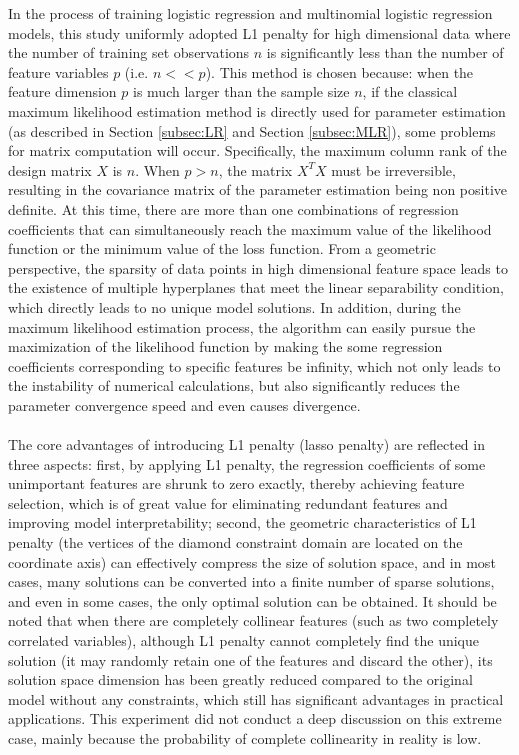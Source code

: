 In the process of training logistic regression and multinomial logistic regression models, this study uniformly adopted L1 penalty for high dimensional data where the number of training set observations $n$ is significantly less than the number of feature variables $p$ (i.e. $n<<p$). This method is chosen because: when the feature dimension $p$ is much larger than the sample size $n$, if the classical maximum likelihood estimation method is directly used for parameter estimation (as described in Section \ref{subsec:LR} and Section \ref{subsec:MLR}), some problems for matrix computation will occur. Specifically, the maximum column rank of the design matrix $X$ is $n$. When $p>n$, the matrix $X^TX$ must be irreversible, resulting in the covariance matrix of the parameter estimation being non positive definite. At this time, there are more than one combinations of regression coefficients that can simultaneously reach the maximum value of the likelihood function or the minimum value of the loss function. From a geometric perspective, the sparsity of data points in high dimensional feature space leads to the existence of multiple hyperplanes that meet the linear separability condition, which directly leads to no unique model solutions. In addition, during the maximum likelihood estimation process, the algorithm can easily pursue the maximization of the likelihood function by making the some regression coefficients corresponding to specific features be infinity, which not only leads to the instability of numerical calculations, but also significantly reduces the parameter convergence speed and even causes divergence.\\
\\
The core advantages of introducing L1 penalty (lasso penalty) are reflected in three aspects: first, by applying L1 penalty, the regression coefficients of some unimportant features are shrunk to zero exactly, thereby achieving feature selection, which is of great value for eliminating redundant features and improving model interpretability; second, the geometric characteristics of L1 penalty (the vertices of the diamond constraint domain are located on the coordinate axis) can effectively compress the size of solution space, and in most cases, many solutions can be converted into a finite number of sparse solutions, and even in some cases, the only optimal solution can be obtained. It should be noted that when there are completely collinear features (such as two completely correlated variables), although L1 penalty cannot completely find the unique solution (it may randomly retain one of the features and discard the other), its solution space dimension has been greatly reduced compared to the original model without any constraints, which still has significant advantages in practical applications. This experiment did not conduct a deep discussion on this extreme case, mainly because the probability of complete collinearity in reality is low.\\
